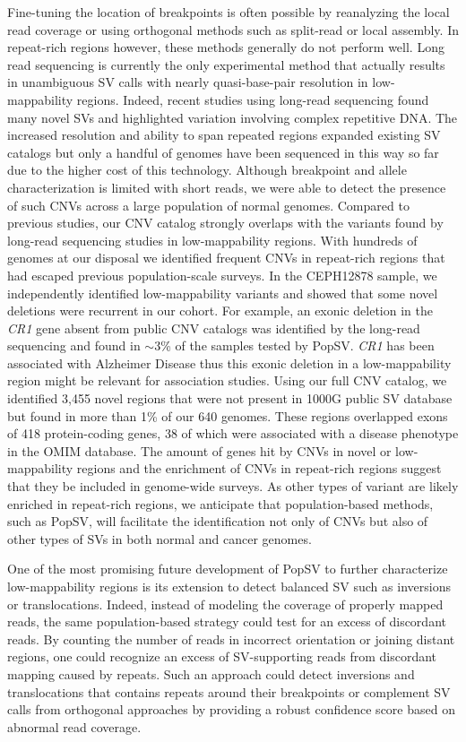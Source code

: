 Fine-tuning the location of breakpoints is often possible by reanalyzing the local read coverage or using orthogonal methods such as split-read or local assembly.
In repeat-rich regions however, these methods generally do not perform well.
Long read sequencing is currently the only experimental method that actually results in unambiguous SV calls with nearly quasi-base-pair resolution in low-mappability regions.
Indeed, recent studies using long-read sequencing\cite{Chaisson2014,Pendleton2015} found many novel SVs and highlighted variation involving complex repetitive DNA.
The increased resolution and ability to span repeated regions expanded existing SV catalogs but only a handful of genomes have been sequenced in this way so far due to the higher cost of this technology.
Although breakpoint and allele characterization is limited with short reads, we were able to detect the presence of such CNVs across a large population of normal genomes.
Compared to previous studies, our CNV catalog strongly overlaps with the variants found by long-read sequencing studies in low-mappability regions.
With hundreds of genomes at our disposal we identified frequent CNVs in repeat-rich regions that had escaped previous population-scale surveys.
In the CEPH12878 sample, we independently identified low-mappability variants and showed that some novel deletions were recurrent in our cohort.
For example, an exonic deletion in the {\it CR1} gene absent from public CNV catalogs was identified by the long-read sequencing and found in $\sim$3\% of the samples tested by {\sf PopSV}.
{\it CR1} has been associated with Alzheimer Disease\cite{Lambert2009} thus this exonic deletion in a low-mappability region might be relevant for association studies.
Using our full CNV catalog, we identified 3,455 novel regions that were not present in 1000G public SV database\cite{Sudmant2015a} but found in more than 1\% of our 640 genomes.
These regions overlapped exons of 418 protein-coding genes, 38 of which were associated with a disease phenotype in the OMIM database.
The amount of genes hit by CNVs in novel or low-mappability regions and the enrichment of CNVs in repeat-rich regions suggest that they be included in genome-wide surveys.
As other types of variant are likely enriched in repeat-rich regions, we anticipate that population-based methods, such as {\sf PopSV}, will facilitate the identification not only of CNVs but also of other types of SVs in both normal and cancer genomes.

One of the most promising future development of PopSV to further characterize low-mappability regions is its extension to detect balanced SV such as inversions or translocations.
Indeed, instead of modeling the coverage of properly mapped reads, the same population-based strategy could test for an excess of discordant reads.
By counting the number of reads in incorrect orientation or joining distant regions, one could recognize an excess of SV-supporting reads from discordant mapping caused by repeats.
Such an approach could detect inversions and translocations that contains repeats around their breakpoints or complement SV calls from orthogonal approaches by providing a robust confidence score based on abnormal read coverage.


